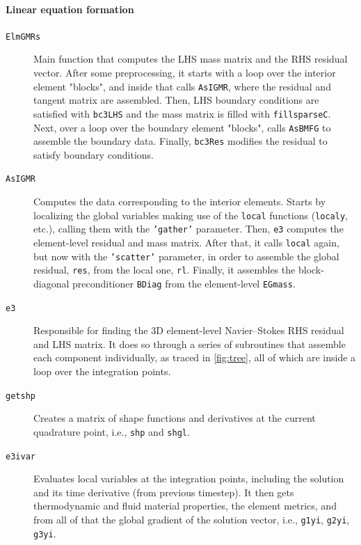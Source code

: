 \documentclass{ucb}
\begin{document}
\paragraph{Linear equation formation}

\begin{description}

    \item[\texttt{ElmGMRs}] Main function that computes the LHS mass matrix and the RHS residual vector. After some preprocessing, it starts with a loop over the interior element "blocks", and inside that calls \texttt{AsIGMR}, where the residual and tangent matrix are assembled. Then, LHS boundary conditions are satisfied with \texttt{bc3LHS} and the mass matrix is filled with \texttt{fillsparseC}. Next, over a loop over the boundary element "blocks", calls \texttt{AsBMFG} to assemble the boundary data. Finally, \texttt{bc3Res} modifies the residual to satisfy boundary conditions.
    
    \item[\texttt{AsIGMR}] Computes the data corresponding to the interior elements. Starts by localizing the global variables making use of the \texttt{local} functions (\texttt{localy}, etc.), calling them with the \texttt{'gather'} parameter. Then, \texttt{e3} computes the element-level residual and mass matrix. After that, it calls \texttt{local} again, but now with the \texttt{'scatter'} parameter, in order to assemble the global residual, \texttt{res}, from the local one, \texttt{rl}. Finally, it assembles the block-diagonal preconditioner \texttt{BDiag} from the element-level \texttt{EGmass}.
    
    \item[\texttt{e3}] Responsible for finding the 3D element-level Navier--Stokes RHS residual and LHS matrix. It does so through a series of subroutines that assemble each component individually, as traced in \autoref{fig:tree}, all of which are inside a loop over the integration points.
    
    \item[\texttt{getshp}] Creates a matrix of shape functions and derivatives at the current quadrature point, i.e., \texttt{shp} and \texttt{shgl}.
    
    \item[\texttt{e3ivar}] Evaluates local variables at the integration points, including the solution and its time derivative (from previous timestep). It then gets thermodynamic and fluid material properties, the element metrics, and from all of that the global gradient of the solution vector, i.e., \texttt{g1yi}, \texttt{g2yi}, \texttt{g3yi}.
    

\end{description}
\end{document}

